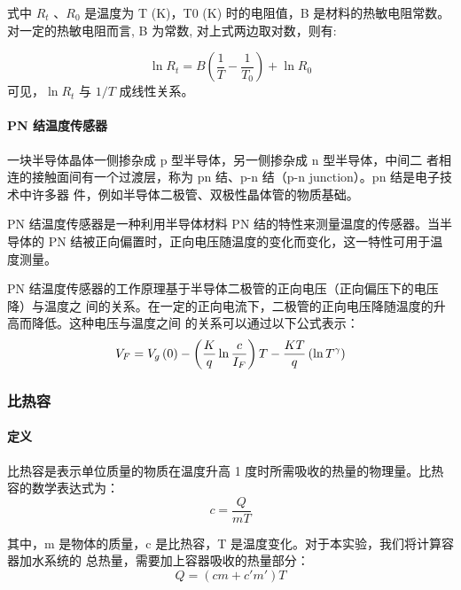 \documentclass[a4paper]{../phyreport}
\begin{document}
式中 $R_{t}$ 、$R_0$ 是温度为 T (K)，T0 (K) 时的电阻值，B 是材料的热敏电阻常数。
对一定的热敏电阻而言, B 为常数, 对上式两边取对数，则有:

\begin{equation}
\label{eq:4}
\ln R_t=B \left( \frac{1}{T}-\frac{1}{T_0} \right)+\ln R_0
\end{equation}
可见，$\ln R_t$ 与 $1/T$ 成线性关系。

\paragraph{PN 结温度传感器}
一块半导体晶体一侧掺杂成 p 型半导体，另一侧掺杂成 n 型半导体，中间二
者相连的接触面间有一个过渡层，称为 pn 结、p-n 结（p-n junction）。pn 结是电子技术中许多器
件，例如半导体二极管、双极性晶体管的物质基础。

PN 结温度传感器是一种利用半导体材料 PN 结的特性来测量温度的传感器。当半导体的 PN
结被正向偏置时，正向电压随温度的变化而变化，这一特性可用于温度测量。

PN 结温度传感器的工作原理基于半导体二极管的正向电压（正向偏压下的电压降）与温度之
间的关系。在一定的正向电流下，二极管的正向电压降随温度的升高而降低。这种电压与温度之间
的关系可以通过以下公式表示：
\begin{equation}
\label{eq:5}
{V_F} = {V_g}\left( 0 \right) - \left( {{K \over q}\ln {c \over {{I_F}}}} \right)T - {{KT} \over q}\left( {\ln {T^\gamma }} \right)
\end{equation}

\subsubsection{比热容}
\paragraph{定义}
比热容是表示单位质量的物质在温度升高 1 度时所需吸收的热量的物理量。比热
容的数学表达式为：
\begin{equation}
\label{eq:6}
c=\frac{Q}{mT}
\end{equation}

其中，m 是物体的质量，c 是比热容，T 是温度变化。对于本实验，我们将计算容器加水系统的
总热量，需要加上容器吸收的热量部分：
\begin{equation}
\label{eq:7}
Q=(cm+c'm')T
\end{equation}
\end{document}
